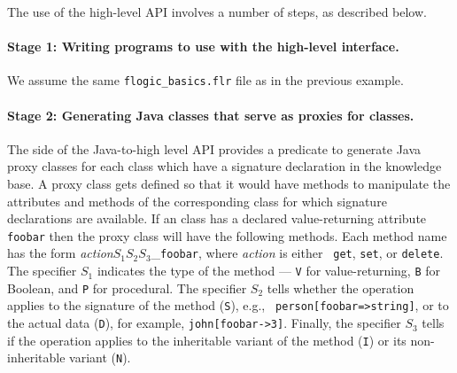 \bigskip

The use of the high-level API involves a number of steps, as described below.

\paragraph{Stage 1: Writing \FLSYSTEM programs to use with the high-level
  interface.}
We assume the same {\tt flogic\_basics.flr} file as in the previous
example.

\paragraph{Stage 2: Generating Java classes that serve as proxies for \FLSYSTEM classes.}
The \FLSYSTEM side of the Java-to-\FLSYSTEM high level API provides a predicate
to generate Java proxy classes for each \fl class which have a signature
declaration in the \FLSYSTEM knowledge base. A proxy class gets defined so
that it would have methods to manipulate the attributes and methods of the
corresponding \fl class for which signature declarations are available.  If
an \fl class has a declared value-returning attribute {\tt foobar} then the
proxy class will have the following methods. Each method name has the form
\emph{action}$S_1S_2S_3$\_{\tt foobar}, where \emph{action} is either {\tt
  get}, {\tt set}, or {\tt delete}. The specifier $S_1$ indicates the type
of the method --- {\tt V} for value-returning, {\tt B} for Boolean, and
{\tt P} for procedural. The specifier $S_2$ tells whether the operation
applies to the signature of the method ({\tt S}), e.g., {\tt
  person[foobar=>string]}, or to the actual data ({\tt D}), for example,
{\tt john[foobar->3]}.  Finally, the specifier $S_3$ tells if the operation
applies to the inheritable variant of the method ({\tt I})
or its non-inheritable variant ({\tt N}).
